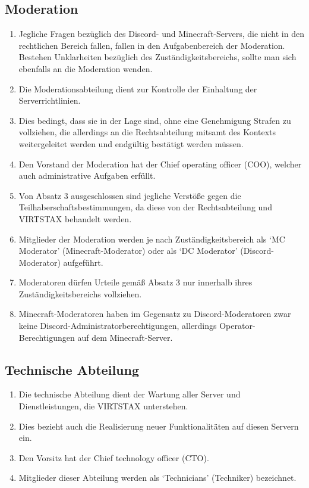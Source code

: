 \documentclass{article}
\begin{document}
\subsection{Moderation}\label{support}
\begin{enumerate}[(1)]
	\item Jegliche Fragen bezüglich des Discord- und Minecraft-Servers, die nicht in den rechtlichen Bereich fallen, fallen in den Aufgabenbereich der Moderation. Bestehen Unklarheiten bezüglich des Zuständigkeitsbereichs, sollte man sich ebenfalls an die Moderation wenden.
	\item Die Moderationsabteilung dient zur Kontrolle der Einhaltung der Serverrichtlinien.
	\item Dies bedingt, dass sie in der Lage sind, ohne eine Genehmigung Strafen zu vollziehen, die allerdings an die Rechtsabteilung mitsamt des Kontexts weitergeleitet werden und endgültig bestätigt werden müssen.
	\item Den Vorstand der Moderation hat der Chief operating officer (COO), welcher auch administrative Aufgaben erfüllt.
	\item Von Absatz 3 ausgeschlossen sind jegliche Verstöße gegen die Teilhaberschaftsbestimmungen, da diese von der Rechtsabteilung und VIRTSTAX behandelt werden.
	\item Mitglieder der Moderation werden je nach Zuständigkeitsbereich als `MC Moderator' (Minecraft-Moderator) oder als `DC Moderator' (Discord-Moderator) aufgeführt.
	\item Moderatoren dürfen Urteile gemäß Absatz 3 nur innerhalb ihres Zuständigkeitsbereichs vollziehen.
	\item Minecraft-Moderatoren haben im Gegensatz zu Discord-Moderatoren zwar keine Discord-Administratorberechtigungen, allerdings Operator-Berechtigungen auf dem Minecraft-Server.
\end{enumerate}

\subsection{Technische Abteilung}
\begin{enumerate}[(1)]
	\item Die technische Abteilung dient der Wartung aller Server und Dienstleistungen, die VIRTSTAX unterstehen.
	\item Dies bezieht auch die Realisierung neuer Funktionalitäten auf diesen Servern ein.
	\item Den Vorsitz hat der Chief technology officer (CTO).
	\item Mitglieder dieser Abteilung werden als `Technicians' (Techniker) bezeichnet.
\end{enumerate}
\end{document}
